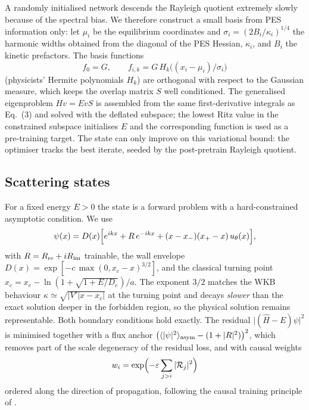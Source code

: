 \documentclass[11pt,a4paper]{article}
\begin{document}
A randomly initialised network descends the Rayleigh quotient extremely slowly
because of the spectral bias. We therefore construct a small basis from PES
information only: let $\mu_i$ be the equilibrium coordinates and
$\sigma_i=(2B_i/\kappa_i)^{1/4}$ the harmonic widths obtained from the diagonal
of the PES Hessian, $\kappa_i$, and $B_i$ the kinetic prefactors. The basis
functions
\begin{equation}
 f_0=G,\qquad f_{i,k}=G\,H_k\bigl((x_i-\mu_i)/\sigma_i\bigr)
\end{equation}
(physicists' Hermite polynomials $H_k$) are orthogonal with respect to the
Gaussian measure, which keeps the overlap matrix $S$ well conditioned. The
generalised eigenproblem $Hv=EvS$ is assembled from the same first-derivative
integrals as Eq.~(3) and solved with the deflated subspace; the lowest Ritz
value in the constrained subspace initialises $E$ and the corresponding function
is used as a pre-training target. The state can only improve on this
variational bound: the optimiser tracks the best iterate, seeded by the
post-pretrain Rayleigh quotient.

\subsection{Scattering states}

For a fixed energy $E>0$ the state is a forward problem with a hard-constrained
asymptotic condition. We use
\begin{equation}
 \psi(x)=D(x)\Bigl[e^{ikx}+R\,e^{-ikx}+(x-x_-)(x_+-x)\,u_\theta(x)\Bigr],
\end{equation}
with $R=R_{\rm re}+iR_{\rm im}$ trainable, the wall envelope
$D(x)=\exp[-c\,\max(0,x_c-x)^{3/2}]$, and the classical turning point
$x_c=x_e-\ln(1+\sqrt{1+E/D_e})/a$. The exponent $3/2$ matches the WKB
behaviour $\kappa\simeq\sqrt{|V'|x-x_c|}$ at the turning point and decays
\emph{slower} than the exact solution deeper in the forbidden region, so the
physical solution remains representable. Both boundary conditions hold exactly.
The residual $\bigl|(\hat H-E)\psi\bigr|^2$ is minimised together with a flux
anchor $\bigl(\langle|\psi|^2\rangle_{\rm asym}-(1+|R|^2)\bigr)^2$, which
removes part of the scale degeneracy of the residual loss, and with causal
weights
\begin{equation}
 w_i=\exp\Bigl(-\varepsilon\sum_{j>i}|\mathcal R_j|^2\Bigr)
 \label{eq:causal}
\end{equation}
ordered along the direction of propagation, following the causal training
principle of \cite{wang2022causal}.
\end{document}
